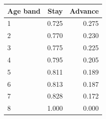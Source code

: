 \begin{tabular}{lrr}
\toprule
Age band & Stay & Advance \\
\midrule
1 & 0.725 & 0.275 \\
2 & 0.770 & 0.230 \\
3 & 0.775 & 0.225 \\
4 & 0.795 & 0.205 \\
5 & 0.811 & 0.189 \\
6 & 0.813 & 0.187 \\
7 & 0.828 & 0.172 \\
8 & 1.000 & 0.000 \\
\bottomrule
\end{tabular}
